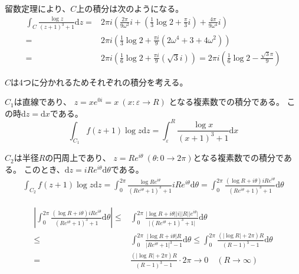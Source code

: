 \documentclass[12pt,b5paper]{ltjsarticle}
\begin{document}
留数定理により、$C$上の積分は次のようになる。
\begin{align}
 \int_{C} \frac{\log{z}}{(z+1)^3+1}\mathrm{d}z
  =& 2\pi i \left(
            \frac{2\pi}{9 \omega^2}i
            + \left(\frac{1}{3}\log{2} + \frac{\pi}{3}i\right)
            + \frac{4\pi}{9 \omega^4}i
           \right)\\
  =&2\pi i \left(
     \frac{1}{3}\log{2}
     + \frac{\pi i}{9} \left( 2\omega^4 + 3 + 4\omega^2  \right)
  \right)\\
 = & 2\pi i \left(
     \frac{1}{6}\log{2}
     + \frac{\pi i}{9} \left( \sqrt{3}i  \right)
  \right)
 = 2\pi i \left(
     \frac{1}{6}\log{2} - \frac{\sqrt{3}\pi}{9}
  \right)
 \label{res_f}
\end{align}



$C$は4つに分かれるためそれぞれの積分を考える。

$C_1$は直線であり、
$z=x e^{0i}=x \ (x:\varepsilon \to R)$
となる複素数での積分である。
この時$\mathrm{d}z=\mathrm{d}x$である。
\begin{equation}
 \int_{C_1} f(z+1)\log{z}\mathrm{d}z
  =\int_{\varepsilon}^{R} \frac{\log{x}}{(x+1)^3+1}\mathrm{d}x
\end{equation}

$C_2$は半径$R$の円周上であり、
$z=Re^{i\theta} \ (\theta : 0\to 2\pi)$となる複素数での積分である。
このとき、$\mathrm{d}z = iRe^{i\theta}\mathrm{d}\theta$である。
\begin{align}
 \int_{C_2} f(z+1)\log{z}\mathrm{d}z
 = \int_{0}^{2\pi} \frac{\log{Re^{i\theta}}}{(Re^{i\theta}+1)^3+1} iRe^{i\theta}\mathrm{d}\theta
 = \int_{0}^{2\pi} \frac{ (\log{R}+i\theta)iRe^{i\theta} }{(R e^{i\theta}+1)^3+1} \mathrm{d}\theta
\end{align}


\begin{align}
  \left\lvert
\int_{0}^{2\pi} \frac{ (\log{R}+i\theta)iRe^{i\theta} }{(R e^{i\theta}+1)^3+1} \mathrm{d}\theta
 \right\rvert
  \leq &
 \int_{0}^{2\pi} \frac{ \lvert \log{R}+i\theta \rvert \lvert i \rvert \lvert R \rvert \lvert e^{i\theta} \rvert  }
 { \lvert (R e^{i\theta}+1)^3+1 \rvert} \mathrm{d}\theta
\\
   \leq &
 \int_{0}^{2\pi} \frac{ \lvert \log{R}+i\theta \rvert R }
 { \lvert R e^{i\theta}+1 \rvert^3-1 } \mathrm{d}\theta
 \leq
 \int_{0}^{2\pi} \frac{ (\lvert \log{R} \rvert +2\pi) R }
 { (R -1)^3-1 } \mathrm{d}\theta\\
 = &  \frac{ (\lvert \log{R} \rvert +2\pi) R }{ (R -1)^3-1 }\cdot 2\pi
 \to 0 \quad (R\to \infty)
\end{align}
\end{document}
